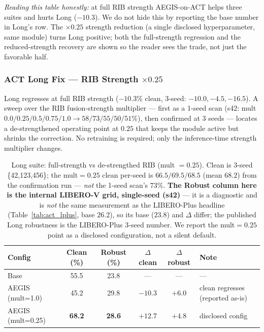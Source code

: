 \documentclass[11pt,a4paper]{article}
\newcommand{\win}[1]{{\color{frozengreen}\textbf{#1}}}
\begin{document}
\noindent\textit{Reading this table honestly:} at full RIB strength AEGIS-on-ACT helps three
suites and hurts Long ($-10.3$). We do not hide this by reporting the base number in Long's row.
The $\times 0.25$ strength reduction (a single disclosed hyperparameter, same module) turns Long
positive; both the full-strength regression and the reduced-strength recovery are shown so the
reader sees the trade, not just the favorable half.

\subsubsection{ACT Long Fix — RIB Strength $\times 0.25$}
\label{sec:actlong}

Long regresses at full RIB strength ($-10.3\%$ clean, 3-seed: $-10.0, -4.5, -16.5$). A sweep
over the RIB fusion-strength multiplier — first as a 1-seed scan (s42: mult $0.0/0.25/0.5/0.75/1.0
\to 58/73/55/50/51\%$), then confirmed at 3 seeds — locates a de-strengthened operating point at
$0.25$ that keeps the module active but shrinks the correction. No retraining is required; only
the inference-time strength multiplier changes.

\begin{table}[H]
\centering
\caption{Long suite: full-strength vs de-strengthed RIB (mult $=0.25$). Clean is 3-seed
\{42,123,456\}; the mult$=0.25$ clean per-seed is $66.5/69.5/68.5$ (mean $68.2$) from the
confirmation run — \emph{not} the 1-seed scan's $73\%$. \textbf{The Robust column here is the
internal LIBERO-V grid, single-seed (s42)} — it is a diagnostic and is \emph{not} the same
measurement as the LIBERO-Plus headline (Table~\ref{tab:act_lplus}, base $26.2$), so its base
($23.8$) and $\Delta$ differ; the published Long robustness is the LIBERO-Plus $3$-seed number.
We report the mult$=0.25$ point as a disclosed configuration, not a silent default.}
\small
\begin{tabular}{lccccl}
\toprule
Config & Clean (\%) & Robust (\%) & $\Delta$ clean & $\Delta$ robust & Note \\
\midrule
Base              & 55.5 & 23.8 & — & — & — \\
AEGIS (mult=1.0)  & 45.2 & 29.8 & $-10.3$ & $+6.0$ & clean regresses (reported as-is) \\
AEGIS (mult=0.25) & \win{68.2} & \win{28.6} & $+12.7$ & $+4.8$ & disclosed config \\
\bottomrule
\end{tabular}
\end{table}
\end{document}
